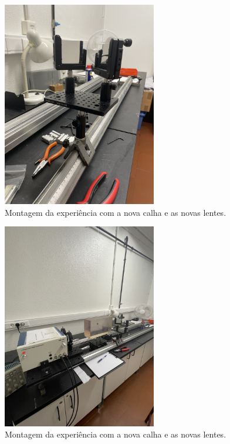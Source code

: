 \documentclass[12pt,a4paper,oneside]{paper}
\begin{document}
\begin{figure}[H]
    \centering
    \includegraphics[width=0.6\textwidth]{IMG_2871.jpg}
    \caption{Montagem da experiência com a nova calha e as novas lentes.}
    \label{fig:montagem}
\end{figure}

\begin{figure}[H]
    \centering
    \includegraphics[width=0.6\textwidth]{IMG_2875.jpg}
    \caption{Montagem da experiência com a nova calha e as novas lentes.}
    \label{fig:montagem}
\end{figure}


\newpage
\end{document}
